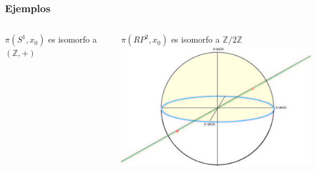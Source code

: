 \documentclass[xetex,mathserif,serif]{beamer}
\begin{document}
  \begin{frame}
    \frametitle{Ejemplos}
  \begin{columns}
    \begin{column}{0.5\textwidth}
      \(\pi (S^1,x_0)\) es isomorfo a \((\mathbb Z, +)\) \\
      \centering
    \end{column}

    \begin{column}{0.5\textwidth}
      \(\pi (RP^2, x_0)\) es isomorfo a \(\mathbb Z / 2 \mathbb Z\) \\
      \centering
      \includegraphics[scale=0.45]{./imag/rpsphere.jpg}
    \end{column}
  \end{columns}
  \end{frame}
\end{document}
